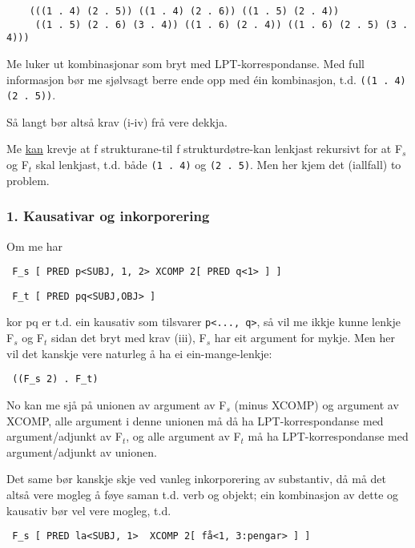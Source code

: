 \documentclass[11pt,a4paper,oneside,draft]{book}
\begin{document}
\begin{verbatim}
    (((1 . 4) (2 . 5)) ((1 . 4) (2 . 6)) ((1 . 5) (2 . 4))
     ((1 . 5) (2 . 6) (3 . 4)) ((1 . 6) (2 . 4)) ((1 . 6) (2 . 5) (3 . 4)))
\end{verbatim}


Me luker ut kombinasjonar som bryt med LPT-korrespondanse. Med full
informasjon bør me sjølvsagt berre ende opp med éin kombinasjon,
t.d. \texttt{((1 . 4) (2 . 5))}.

Så langt bør altså krav (i-iv) frå \citet{dyvik2009lmp} vere dekkja.

Me \underline{kan} krevje at f strukturane-til f strukturdøtre-kan lenkjast
rekursivt for at F$_s$ og F$_t$ skal lenkjast, t.d. både \texttt{(1 . 4)} og \texttt{(2 . 5)}. Men her kjem det (iallfall) to problem.


\subsubsection{1. Kausativar og inkorporering}
\label{sec-3.6.4.1}

Om me har 

\begin{verbatim}
 F_s [ PRED p<SUBJ, 1, 2> XCOMP 2[ PRED q<1> ] ]
\end{verbatim}


\begin{verbatim}
 F_t [ PRED pq<SUBJ,OBJ> ]
\end{verbatim}


kor pq er t.d. ein kausativ som tilsvarer \texttt{p<..., q>}, så vil me ikkje
kunne lenkje F$_s$ og F$_t$ sidan det bryt med krav (iii), F$_s$ har eit
argument for mykje. Men her vil det kanskje vere naturleg å ha ei
ein-mange-lenkje:

\begin{verbatim}
 ((F_s 2) . F_t)
\end{verbatim}


No kan me sjå på unionen av argument av F$_s$ (minus XCOMP) og argument
av XCOMP, alle argument i denne unionen må då ha LPT-korrespondanse
med argument/adjunkt av F$_t$, og alle argument av F$_t$ må ha
LPT-korrespondanse med argument/adjunkt av unionen.

Det same bør kanskje skje ved vanleg inkorporering av substantiv, då
må det altså vere mogleg å føye saman t.d. verb og objekt; ein
kombinasjon av dette og kausativ bør vel vere mogleg, t.d.

\begin{verbatim}
 F_s [ PRED la<SUBJ, 1>  XCOMP 2[ få<1, 3:pengar> ] ]
\end{verbatim}
\end{document}
